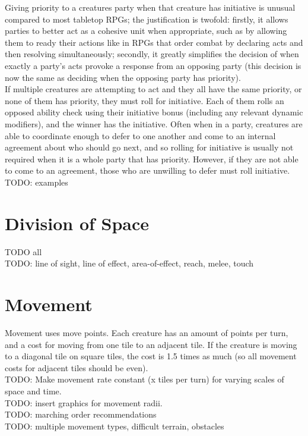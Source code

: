 \documentclass[letterpaper,titlepage,openany,twocolumn]{book}
\begin{document}
Giving priority to a creatures party when that creature has initiative is unusual compared to most tabletop RPGs; the justification is twofold: firstly, it allows parties to better act as a cohesive unit when appropriate, such as by allowing them to ready their actions like in RPGs that order combat by declaring acts and then resolving simultaneously; secondly, it greatly simplifies the decision of when exactly a party’s acts provoke a response from an opposing party (this decision is now the same as deciding when the opposing party has priority).\\

If multiple creatures are attempting to act and they all have the same priority, or none of them has priority, they must roll for initiative. Each of them rolls an opposed ability check using their initiative bonus (including any relevant dynamic modifiers), and the winner has the initiative. Often when in a party, creatures are able to coordinate enough to defer to one another and come to an internal agreement about who should go next, and so rolling for initiative is usually not required when it is a whole party that has priority. However, if they are not able to come to an agreement, those who are unwilling to defer must roll initiative.\\
TODO: examples\\

\section{Division of Space}
TODO all\\
TODO: line of sight, line of effect, area-of-effect, reach, melee, touch\\

\section{Movement}
Movement uses move points. Each creature has an amount of points per turn, and a cost for moving from one tile to an adjacent tile. If the creature is moving to a diagonal tile on square tiles, the cost is 1.5 times as much (so all movement costs for adjacent tiles should be even).\\
TODO: Make movement rate constant (x tiles per turn) for varying scales of space and time.\\
TODO: insert graphics for movement radii.\\
TODO: marching order recommendations\\
TODO: multiple movement types, difficult terrain, obstacles\\
\end{document}
